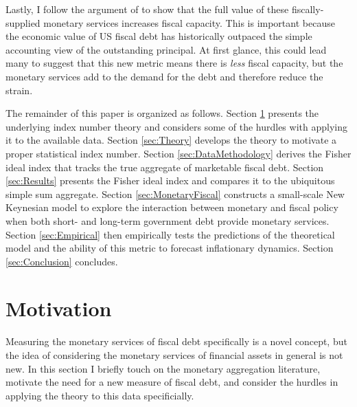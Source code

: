 \documentclass[11pt,a4paper,margin=1.5in]{article}
\begin{document}
Lastly, I follow the argument of \citet{Brunnermeier-Merkel-Sannikov:2022} to show that the full value of these fiscally-supplied monetary services increases fiscal capacity.
This is important because the economic value of US fiscal debt has historically outpaced the simple accounting view of the outstanding principal.
At first glance, this could lead many to suggest that this new metric means there is {\em less} fiscal capacity, but the monetary services add to the demand for the debt and therefore reduce the strain.


The remainder of this paper is organized as follows.
Section \ref{sec:MonAgg} presents the underlying index number theory and considers some of the hurdles with applying it to the available data.
Section \ref{sec:Theory} develops the theory to motivate a proper statistical index number.
Section \ref{sec:DataMethodology} derives the Fisher ideal index that tracks the true aggregate of marketable fiscal debt.
Section \ref{sec:Results} presents the Fisher ideal index and compares it to the ubiquitous simple sum aggregate.
Section \ref{sec:MonetaryFiscal} constructs a small-scale New Keynesian model to explore the interaction between monetary and fiscal policy when both short- and long-term government debt provide monetary services.
Section \ref{sec:Empirical} then empirically tests the predictions of the theoretical model and the ability of this metric to forecast inflationary dynamics.
Section \ref{sec:Conclusion} concludes.


\section{Motivation}
\label{sec:MonAgg}
Measuring the monetary services of fiscal debt specifically is a novel concept, but the idea of considering the monetary services of financial assets in general is not new.
In this section I briefly touch on the monetary aggregation literature, motivate the need for a new measure of fiscal debt, and consider the hurdles in applying the theory to this data specificially. 
\end{document}
